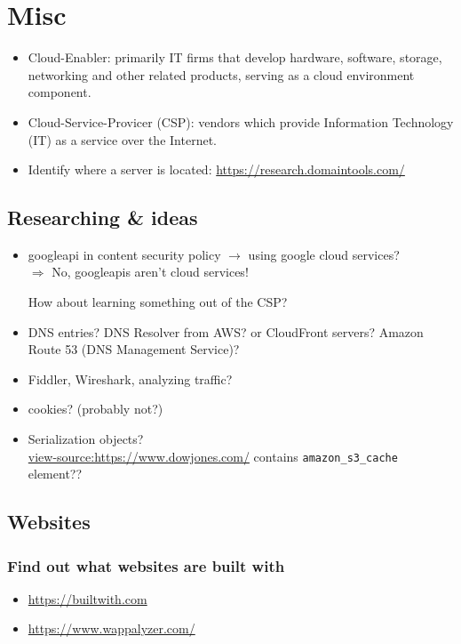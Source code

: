 \documentclass[12pt]{article}
\begin{document}
\newpage
\section*{Misc}
\begin{itemize}
    \item Cloud-Enabler: primarily IT firms that develop hardware, software, storage, networking and other related products, serving as a cloud environment component.
    \item Cloud-Service-Provicer (CSP): vendors which provide Information Technology (IT) as a service over the Internet.
    \item Identify where a server is located: \url{https://research.domaintools.com/}
\end{itemize}


\subsection*{Researching \& ideas}
\begin{itemize}
    \item googleapi in content security policy $\rightarrow$ using google cloud services? \\
    $\Rightarrow$ No, googleapis aren't cloud services!
    
    How about learning something out of the CSP?
    
    \item DNS entries? DNS Resolver from AWS? or CloudFront servers? Amazon Route 53 (DNS Management Service)?
    
    \item Fiddler, Wireshark, analyzing traffic?

    \item cookies? (probably not?)
    
    \item Serialization objects? \\
    \url{view-source:https://www.dowjones.com/} contains \verb|amazon_s3_cache| element??
\end{itemize}


\subsection*{Websites}
\subsubsection*{Find out what websites are built with}
\begin{itemize}
    \item \url{https://builtwith.com}
    \item \url{https://www.wappalyzer.com/}
\end{itemize}
\end{document}
